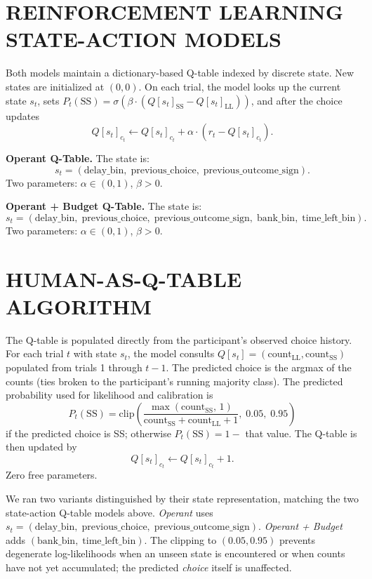 \documentclass[12pt]{article}
\begin{document}
\section*{REINFORCEMENT LEARNING STATE-ACTION MODELS}

\indent Both models maintain a dictionary-based Q-table indexed by discrete state. New states are initialized at $(0, 0)$. On each trial, the model looks up the current state $s_t$, sets $P_t(\mathrm{SS}) = \sigma\!\left( \beta \cdot (Q[s_t]_{\mathrm{SS}} - Q[s_t]_{\mathrm{LL}}) \right)$, and after the choice updates
\[
Q[s_t]_{c_t} \leftarrow Q[s_t]_{c_t} + \alpha \cdot (r_t - Q[s_t]_{c_t}).
\]

\textbf{Operant Q-Table.} The state is:
\[
s_t = (\mathrm{delay\_bin},\; \mathrm{previous\_choice},\; \mathrm{previous\_outcome\_sign}).
\]
Two parameters: $\alpha \in (0, 1)$, $\beta > 0$.

\textbf{Operant + Budget Q-Table.} The state is:
\[
s_t = (\mathrm{delay\_bin},\; \mathrm{previous\_choice},\; \mathrm{previous\_outcome\_sign},\; \mathrm{bank\_bin},\; \mathrm{time\_left\_bin}).
\]
Two parameters: $\alpha \in (0, 1)$, $\beta > 0$.

\section*{HUMAN-AS-Q-TABLE ALGORITHM}

\indent The Q-table is populated directly from the participant's observed choice history. For each trial $t$ with state $s_t$, the model consults $Q[s_t] = (\mathrm{count}_{\mathrm{LL}}, \mathrm{count}_{\mathrm{SS}})$ populated from trials 1 through $t - 1$. The predicted choice is the argmax of the counts (ties broken to the participant's running majority class). The predicted probability used for likelihood and calibration is
\[
P_t(\mathrm{SS}) = \mathrm{clip}\!\left( \frac{\max(\mathrm{count}_{\mathrm{SS}},\, 1)}{\mathrm{count}_{\mathrm{SS}} + \mathrm{count}_{\mathrm{LL}} + 1},\; 0.05,\; 0.95 \right)
\]
if the predicted choice is SS; otherwise $P_t(\mathrm{SS}) = 1 - $ that value. The Q-table is then updated by
\[
Q[s_t]_{c_t} \leftarrow Q[s_t]_{c_t} + 1.
\]
Zero free parameters.

We ran two variants distinguished by their state representation, matching the two state-action Q-table models above. \textit{Operant} uses $s_t = (\mathrm{delay\_bin},\; \mathrm{previous\_choice},\; \mathrm{previous\_outcome\_sign})$. \textit{Operant + Budget} adds $(\mathrm{bank\_bin},\; \mathrm{time\_left\_bin})$. The clipping to $(0.05, 0.95)$ prevents degenerate log-likelihoods when an unseen state is encountered or when counts have not yet accumulated; the predicted \textit{choice} itself is unaffected.
\end{document}
